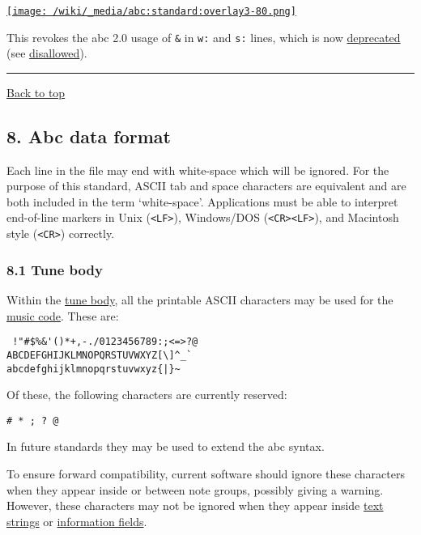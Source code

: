 \href{/wiki/_detail/abc:standard:overlay3-80.png?id=abc\%3Astandard\%3Av2.1}{\texttt{[image: /wiki/\_media/abc:standard:overlay3-80.png]}}

This revokes the abc 2.0 usage of \texttt{\&} in \texttt{w:} and
\texttt{s:} lines, which is now
\protect\hyperlink{outdated_syntax}{deprecated} (see
\protect\hyperlink{disallowed_voice_overlay}{disallowed}).

\begin{center}\rule{0.5\linewidth}{\linethickness}\end{center}

\protect\hyperlink{}{Back to top}

\hypertarget{abc_data_format}{\subsection{8. Abc data
format}\label{abc_data_format}}

Each line in the file may end with white-space which will be ignored.
For the purpose of this standard, ASCII tab and space characters are
equivalent and are both included in the term `white-space'. Applications
must be able to interpret end-of-line markers in Unix
(\texttt{\textless{}LF\textgreater{}}), Windows/DOS
(\texttt{\textless{}CR\textgreater{}\textless{}LF\textgreater{}}), and
Macintosh style (\texttt{\textless{}CR\textgreater{}}) correctly.

\hypertarget{tune_body}{\subsubsection{8.1 Tune body}\label{tune_body}}

Within the \protect\hyperlink{tune_body_definition}{tune body}, all the
printable ASCII characters may be used for the
\protect\hyperlink{music_code_definition}{music code}. These are:

\begin{verbatim}
 !"#$%&'()*+,-./0123456789:;<=>?@
ABCDEFGHIJKLMNOPQRSTUVWXYZ[\]^_`
abcdefghijklmnopqrstuvwxyz{|}~
\end{verbatim}

Of these, the following characters are currently reserved:

\begin{verbatim}
# * ; ? @
\end{verbatim}

In future standards they may be used to extend the abc syntax.

To ensure forward compatibility, current software should ignore these
characters when they appear inside or between note groups, possibly
giving a warning. However, these characters may not be ignored when they
appear inside \protect\hyperlink{text_string_definition}{text strings}
or \protect\hyperlink{information_field_definition}{information fields}.

